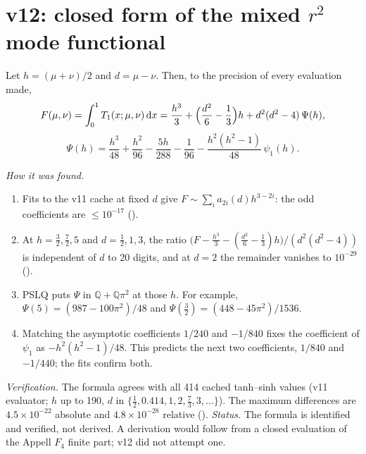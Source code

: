 \section{v12: closed form of the mixed \texorpdfstring{\(r^2\)}{r2} mode functional}
\label{sec:v12F}

\begin{proposition}
\label{prop:v12F}
Let \(h=(\mu+\nu)/2\) and \(d=\mu-\nu\). Then, to the precision of
every evaluation made,
\[
F(\mu,\nu)=\int_0^1T_1(x;\mu,\nu)\,\mathrm dx
=\frac{h^3}{3}+\Bigl(\frac{d^2}{6}-\frac13\Bigr)h+d^2(d^2-4)\,\Psi(h),
\]
\[
\Psi(h)=\frac{h^3}{48}+\frac{h^2}{96}-\frac{5h}{288}-\frac1{96}-\frac{h^2(h^2-1)}{48}\,\psi_1(h).
\]
\end{proposition}
\noindent\emph{How it was found.}
\begin{enumerate}[label=(\alph*)]
\item Fits to the v11 cache at fixed \(d\) give
\(F\sim\sum_ia_{2i}(d)h^{3-2i}\): the odd coefficients are
\(\le10^{-17}\) ().
\item At \(h=\tfrac32,\tfrac72,5\) and \(d=\tfrac12,1,3\), the ratio
\(\bigl(F-\tfrac{h^3}3-(\tfrac{d^2}6-\tfrac13)h\bigr)/(d^2(d^2-4))\)
is independent of \(d\) to 20 digits, and at \(d=2\) the remainder
vanishes to \(10^{-29}\) ().
\item PSLQ puts \(\Psi\) in \(\mathbb Q+\mathbb Q\pi^2\) at those
\(h\). For example, \(\Psi(5)=(987-100\pi^2)/48\) and
\(\Psi(\tfrac32)=(448-45\pi^2)/1536\).
\item Matching the asymptotic coefficients \(1/240\) and \(-1/840\)
fixes the coefficient of \(\psi_1\) as \(-h^2(h^2-1)/48\). This
predicts the next two coefficients, \(1/840\) and \(-1/440\); the
fits confirm both.
\end{enumerate}
\emph{Verification.} The formula agrees with all 414 cached
tanh--sinh values (v11 evaluator; \(h\) up to 190, \(d\) in
\(\{\tfrac12,0.414,1,2,\tfrac73,3,\dots\}\)). The maximum differences
are \(4.5\times10^{-22}\) absolute and \(4.8\times10^{-28}\) relative
(). \emph{Status.} The formula is
identified and verified, not derived. A derivation would follow from
a closed evaluation of the Appell \(F_4\) finite part; v12 did not
attempt one.

